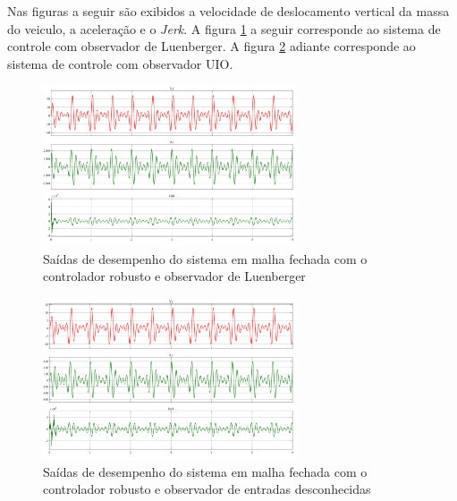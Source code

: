 Nas figuras a seguir são exibidos a velocidade de deslocamento vertical da massa do veiculo, a aceleração e o \emph{Jerk}. A figura \ref{fig:eval_cntrol_LUE} a seguir corresponde ao sistema de controle com observador de Luenberger. A figura \ref{fig:eval_cntrol_UIO} adiante corresponde ao sistema de controle com observador UIO.
\FloatBarrier
\begin{figure}[htbp]
    \begin{centering}
    \includegraphics[width=7.5cm]{img/eval_cntrol_LUE.png} 
    \caption{Saídas de desempenho do sistema em malha fechada com o controlador robusto e observador de Luenberger}
    \label{fig:eval_cntrol_LUE}
    \end{centering}
\end{figure}
\FloatBarrier

\begin{figure}[htbp]
    \begin{centering}
    \includegraphics[width=7.5cm]{img/eval_cntrol_UIO.png} 
    \caption{Saídas de desempenho do sistema em malha fechada com o controlador robusto e observador de entradas desconhecidas}
    \label{fig:eval_cntrol_UIO}
    \end{centering}
\end{figure}
\FloatBarrier

